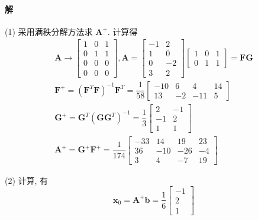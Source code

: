 \documentclass[12pt, a4paper, oneside, fontset=none]{ctexart}
\begin{document}
\paragraph*{解} (1) 采用满秩分解方法求 $\bm{A}^+$. 计算得
\begin{gather*}
    \bm{A} \to \begin{bmatrix}
        1 & 0 & 1 \\
        0 & 1 & 1 \\
        0 & 0 & 0 \\
        0 & 0 & 0
    \end{bmatrix}, \bm{A} = \begin{bmatrix}
        -1 & 2  \\
        1  & 0  \\
        0  & -2 \\
        3  & 2
    \end{bmatrix}\begin{bmatrix}
        1 & 0 & 1 \\
        0 & 1 & 1
    \end{bmatrix} = \bm{FG} \\
    \bm{F}^+ = (\bm{F}^T\bm{F})^{-1}\bm{F}^T = \dfrac{1}{58}\begin{bmatrix}
        -10 & 6  & 4   & 14 \\
        13  & -2 & -11 & 5
    \end{bmatrix} \\
    \bm{G}^+ = \bm{G}^T(\bm{GG}^T)^{-1} = \dfrac{1}{3}\begin{bmatrix}
        2  & -1 \\
        -1 & 2  \\
        1  & 1
    \end{bmatrix} \\
    \bm{A}^+ = \bm{G}^+\bm{F}^+ = \dfrac{1}{174}\begin{bmatrix}
        -33 & 14  & 19  & 23 \\
        36  & -10 & -26 & -4 \\
        3   & 4   & -7  & 19
    \end{bmatrix}
\end{gather*}
\par (2) 计算, 有
$$
    \bm{x}_0 = \bm{A}^+\bm{b} =\dfrac{1}{6}\begin{bmatrix}
        -1 \\
        2  \\
        1
    \end{bmatrix}
$$
\end{document}
